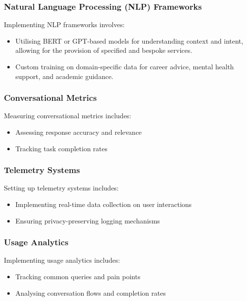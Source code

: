 \documentclass[14pt,a4paper]{article}
\begin{document}
\begin{multicols}{2}
\subsubsection*{Natural Language Processing (NLP) Frameworks}
Implementing NLP frameworks \textit{\parencite[pp. 1-15]{JurafskyMartin2024}} involves:
\begin{itemize}
    \item Utilising BERT or GPT-based models for understanding context and intent, allowing for the provision of specified and bespoke services.
    \item Custom training on domain-specific data for career advice, mental health support, and academic guidance.
\end{itemize}


\subsubsection{Conversational Metrics}
Measuring conversational metrics \textit{\parencite[pp. 1-32]{Quarteroni2024}} includes:
\begin{itemize}
    \item Assessing response accuracy and relevance
    \item Tracking task completion rates
\end{itemize}

\subsubsection*{Telemetry Systems}
Setting up telemetry systems \textit{\parencite[pp. 30-60]{Vadapalli2023}} includes:
\begin{itemize}
    \item Implementing real-time data collection on user interactions
    \item Ensuring privacy-preserving logging mechanisms
\end{itemize}



\subsubsection{Usage Analytics}
Implementing usage analytics \textit{\parencite[pp. 50-100]{Beasley2023}} includes:
\begin{itemize}
    \item Tracking common queries and pain points
    \item Analysing conversation flows and completion rates
\end{itemize}


\end{multicols}
\end{document}
